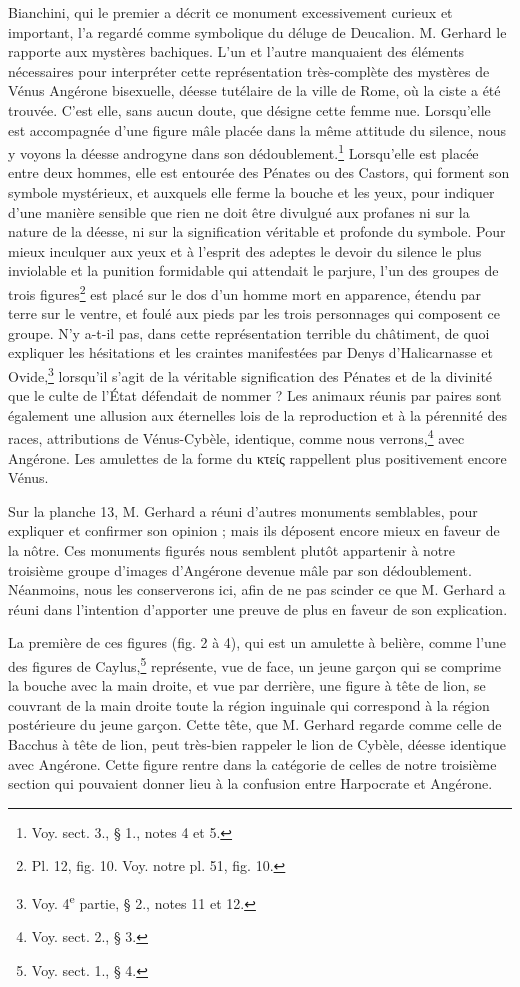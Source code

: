 \documentclass[a4paper, 11pt, oneside, polutonikogreek, french]{article}
\begin{document}
Bianchini, qui le premier a décrit ce monument excessivement curieux et important, l'a regardé comme symbolique du déluge de Deucalion. M. Gerhard le rapporte aux mystères bachiques. L'un et l'autre manquaient des éléments nécessaires pour interpréter cette représentation très-complète des mystères de Vénus Angérone bisexuelle, déesse tutélaire de la ville de Rome, où la ciste a été trouvée. C'est elle, sans aucun doute, que désigne cette femme nue. Lorsqu'elle est accompagnée d'une figure mâle placée dans la même attitude du silence, nous y voyons la déesse androgyne dans son dédoublement.\footnote{Voy. sect. 3., § 1., notes 4 et 5.} Lorsqu'elle est placée entre deux hommes, elle est entourée des Pénates ou des Castors, qui forment son symbole mystérieux, et auxquels elle ferme la bouche et les yeux, pour indiquer d'une manière sensible que rien ne doit être divulgué aux profanes ni sur la nature de la déesse, ni sur la signification véritable et profonde du symbole. Pour mieux inculquer aux yeux et à l'esprit des adeptes le devoir du silence le plus inviolable et la punition formidable qui attendait le parjure, l'un des groupes de trois figures\footnote{Pl. 12, fig. 10. Voy. notre pl. 51, fig. 10.} est placé sur le dos d'un homme mort en apparence, étendu par terre sur le ventre, et foulé aux pieds par les trois personnages qui composent ce groupe. N'y a-t-il pas, dans cette représentation terrible du châtiment, de quoi expliquer les hésitations et les craintes manifestées par Denys d'Halicarnasse et Ovide,\footnote{Voy. 4\textsuperscript{e} partie, § 2., notes 11 et 12.} lorsqu'il s'agit de la véritable signification des Pénates et de la divinité que le culte de l'État défendait de nommer ? Les animaux réunis par paires sont également une allusion aux éternelles lois de la reproduction et à la pérennité des races, attributions de Vénus-Cybèle, identique, comme nous verrons,\footnote{Voy. sect. 2., § 3.} avec Angérone. Les amulettes de la forme du κτείς rappellent plus positivement encore Vénus.

Sur la planche 13, M. Gerhard a réuni d'autres monuments semblables, pour expliquer et confirmer son opinion ; mais ils déposent encore mieux en faveur de la nôtre. Ces monuments figurés nous semblent plutôt appartenir à notre troisième groupe d'images d'Angérone devenue mâle par son dédoublement. Néanmoins, nous les conserverons ici, afin de ne pas scinder ce que M. Gerhard a réuni dans l'intention d'apporter une preuve de plus en faveur de son explication.

La première de ces figures (fig. 2 à 4), qui est un amulette à belière, comme l'une des figures de Caylus,\footnote{Voy. sect. 1., § 4.} représente, vue de face, un jeune garçon qui se comprime la bouche avec la main droite, et vue par derrière, une figure à tête de lion, se couvrant de la main droite toute la région inguinale qui correspond à la région postérieure du jeune garçon. Cette tête, que M. Gerhard regarde comme celle de Bacchus à tête de lion, peut très-bien rappeler le lion de Cybèle, déesse identique avec Angérone. Cette figure rentre dans la catégorie de celles de notre troisième section qui pouvaient donner lieu à la confusion entre Harpocrate et Angérone.
\end{document}
